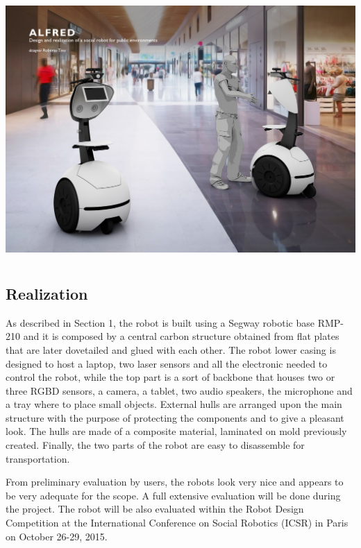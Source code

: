 \begin{center}
\includegraphics[height=10cm]{fig/Tavola04.jpg}\\
\end{center}


\subsection{Realization}

As described in Section 1, the robot is built using a Segway robotic base RMP-210 and it is composed by a central carbon structure
obtained from flat plates that are later dovetailed and glued with each other.
The robot lower casing is designed to host a laptop, two laser sensors and all the electronic needed to control
the robot, while the top part is a sort of backbone that houses two or three RGBD sensors, a camera, a tablet,
two audio speakers, the microphone and a tray where to place small objects.
External hulls are arranged upon the main structure with the purpose of protecting the components and to
give a pleasant look. The hulls are made of a composite material, laminated on mold previously created.
Finally, the two parts of the robot are easy to disassemble for transportation.


From preliminary evaluation by users, the robots look very nice and appears to be very adequate for the scope. A full extensive evaluation will be done during the project. The robot will be also evaluated within the Robot Design Competition at the International Conference on Social Robotics (ICSR) in Paris on October 26-29, 2015. 




